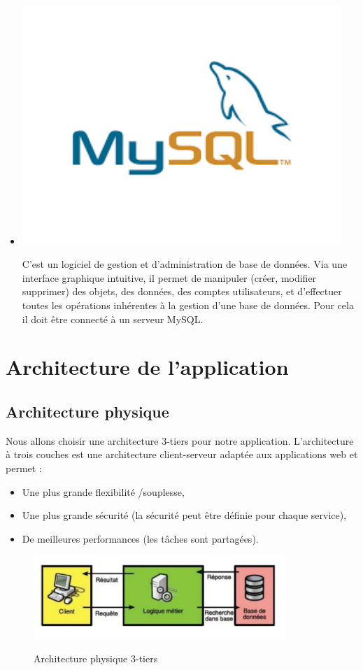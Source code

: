 \begin{itemize}
 \item  \begin{minipage}{.25\textwidth}%
 	\includegraphics[width=0.95\textwidth]{D) IMAGES/sql.png}
 \end{minipage}%
C’est un logiciel de gestion et d’administration de base de données. Via une interface graphique 
intuitive, il permet de manipuler (créer, modifier supprimer) des objets, des données, des comptes 
utilisateurs, et d’effectuer toutes les opérations inhérentes à la gestion d’une base de données. Pour 
cela il doit être connecté à un serveur MySQL.
	
\end{itemize}
\section{Architecture de l'application}

\subsection{Architecture physique}
Nous allons choisir une architecture 3-tiers pour notre application. L’architecture à trois
couches est une architecture client-serveur adaptée aux applications web et permet :
\begin{itemize}
	\item Une plus grande flexibilité /souplesse,
	\item Une plus grande sécurité (la sécurité peut être définie pour chaque service),
	\item De meilleures performances (les tâches sont partagées).
\end{itemize}
\begin{figure}[!h]
	\centering
	{\includegraphics[width=0.85\textwidth]{D) IMAGES/arch.png}}
	\caption{Architecture physique 3-tiers}
	\label{Diagramme3}
\end{figure}
